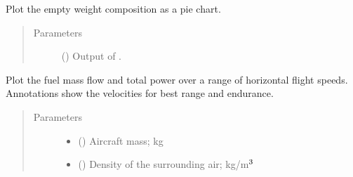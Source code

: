 \documentclass[letterpaper,10pt,english]{sphinxmanual}
\begin{document}
\begin{fulllineitems}
\begin{fulllineitems}
\label{\detokenize{modules/helicopter:helicopter.Helicopter.plot_empty_weight_pie}}
\sphinxAtStartPar
Plot the empty weight composition as a pie chart.
\begin{quote}\begin{description}
\item[{Parameters}] \leavevmode
\sphinxAtStartPar
{} () \textendash{} Output of {\hyperref[\detokenize{modules/helicopter:helicopter.Helicopter.empty_weight_estimation}]{}}.

\end{description}\end{quote}

\end{fulllineitems}


\begin{fulllineitems}
\label{\detokenize{modules/helicopter:helicopter.Helicopter.plot_fuel_curve}}
\sphinxAtStartPar
Plot the fuel mass flow and total power over a range of horizontal
flight speeds. Annotations show the velocities for best range and
endurance.
\begin{quote}\begin{description}
\item[{Parameters}] \leavevmode\begin{itemize}
\item {} 
\sphinxAtStartPar
{} () \textendash{} Aircraft mass; kg

\item {} 
\sphinxAtStartPar
{} () \textendash{} Density of the surrounding air; kg/m\(\sp{\text{3}}\)


\end{itemize}
\end{description}
\end{quote}
\end{fulllineitems}
\end{fulllineitems}
\end{document}
